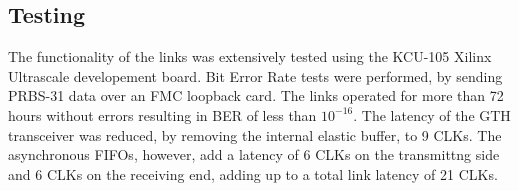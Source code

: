 \documentclass[a4paper]{PoS}
\begin{document}
\subsection{Testing}
The functionality of the links was extensively tested using the KCU-105 Xilinx Ultrascale developement board. Bit Error Rate tests were performed, by sending PRBS-31 data over an FMC loopback card. The links operated for more than 72 hours without errors resulting in BER of less than $10^{-16}$. The latency of the GTH transceiver was reduced, by removing the internal elastic buffer, to 9 CLKs. The asynchronous FIFOs, however, add a latency of 6 CLKs on the transmittng side and 6 CLKs on the receiving end, adding up to a total link latency of 21 CLKs.

 


\end{document}
